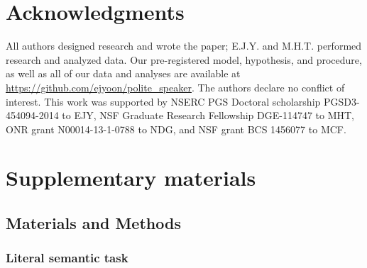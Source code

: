 \documentclass[12pt]{article}
\begin{document}









\section*{Acknowledgments}
All authors designed research and wrote the paper;
E.J.Y. and M.H.T. performed research and analyzed data.
Our pre-registered model,
hypothesis, and procedure, as well as all of our data and analyses are available at
\url{https://github.com/ejyoon/polite_speaker}.
The authors declare no conflict of interest.
This work was supported by NSERC PGS Doctoral scholarship
PGSD3-454094-2014 to EJY, NSF Graduate Research Fellowship DGE-114747 to
MHT, ONR grant N00014-13-1-0788 to NDG, and NSF grant BCS 1456077 to
MCF.


\section*{Supplementary materials}

\subsection*{Materials and Methods}\label{materials-and-methods}

\subsubsection*{Literal semantic task}\label{literal-semantic-task}
\end{document}
